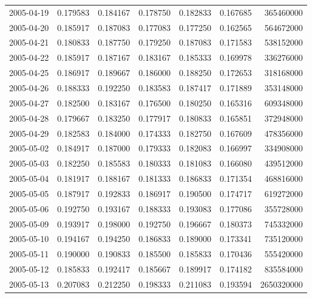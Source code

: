 \begin{tabular}{lrrrrrr}
2005-04-19 &    0.179583 &    0.184167 &    0.178750 &    0.182833 &    0.167685 &   365460000 \\
2005-04-20 &    0.185917 &    0.187083 &    0.177083 &    0.177250 &    0.162565 &   564672000 \\
2005-04-21 &    0.180833 &    0.187750 &    0.179250 &    0.187083 &    0.171583 &   538152000 \\
2005-04-22 &    0.185917 &    0.187167 &    0.183167 &    0.185333 &    0.169978 &   336276000 \\
2005-04-25 &    0.186917 &    0.189667 &    0.186000 &    0.188250 &    0.172653 &   318168000 \\
2005-04-26 &    0.188333 &    0.192250 &    0.183583 &    0.187417 &    0.171889 &   353148000 \\
2005-04-27 &    0.182500 &    0.183167 &    0.176500 &    0.180250 &    0.165316 &   609348000 \\
2005-04-28 &    0.179667 &    0.183250 &    0.177917 &    0.180833 &    0.165851 &   372948000 \\
2005-04-29 &    0.182583 &    0.184000 &    0.174333 &    0.182750 &    0.167609 &   478356000 \\
2005-05-02 &    0.184917 &    0.187000 &    0.179333 &    0.182083 &    0.166997 &   334908000 \\
2005-05-03 &    0.182250 &    0.185583 &    0.180333 &    0.181083 &    0.166080 &   439512000 \\
2005-05-04 &    0.181917 &    0.188167 &    0.181333 &    0.186833 &    0.171354 &   468816000 \\
2005-05-05 &    0.187917 &    0.192833 &    0.186917 &    0.190500 &    0.174717 &   619272000 \\
2005-05-06 &    0.192750 &    0.193167 &    0.188333 &    0.193083 &    0.177086 &   355728000 \\
2005-05-09 &    0.193917 &    0.198000 &    0.192750 &    0.196667 &    0.180373 &   745332000 \\
2005-05-10 &    0.194167 &    0.194250 &    0.186833 &    0.189000 &    0.173341 &   735120000 \\
2005-05-11 &    0.190000 &    0.190833 &    0.185500 &    0.185833 &    0.170436 &   555420000 \\
2005-05-12 &    0.185833 &    0.192417 &    0.185667 &    0.189917 &    0.174182 &   835584000 \\
2005-05-13 &    0.207083 &    0.212250 &    0.198333 &    0.211083 &    0.193594 &  2650320000 \\

\end{tabular}
